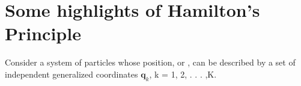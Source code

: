 
\section{Some highlights of Hamilton's Principle}
Consider a system of particles whose position, or , can be described by a set of independent generalized coordinates $\mathbf{q}_{k}$, k = 1, 2, . . . ,K.






  